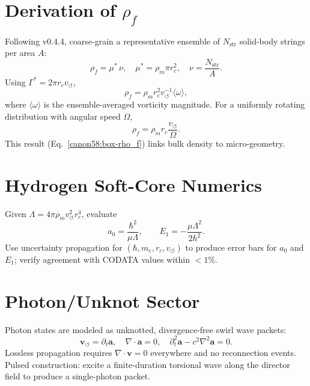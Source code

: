 \documentclass[10pt,reprint,aps,onecolumn,nofootinbib]{revtex4-2}
\begin{document}
    \section{Derivation of $\rho_{\!f}$}
    \label{canon58:appC}
    Following v0.4.4, coarse-grain a representative ensemble of $N_{\mathrm{str}}$
    solid-body strings per area $A$:
    \[
        \rho_{\!f} = \mu^{*}\,\nu, \quad
        \mu^{*} = \rho_{\!m} \pi r_c^{2}, \quad
        \nu = \frac{N_{\mathrm{str}}}{A}.
    \]
    Using $\Gamma^{*} = 2\pi r_c v_{\!\boldsymbol{\circlearrowleft}}$,
    \[
        \rho_{\!f} = \rho_{\!m} r_c^{2} v_{\!\boldsymbol{\circlearrowleft}}^{-1} \langle \omega \rangle,
    \]
    where $\langle \omega \rangle$ is the ensemble-averaged vorticity magnitude.
    For a uniformly rotating distribution with angular speed $\Omega$,
    \[
        \rho_{\!f} = \rho_{\!m} r_c \frac{v_{\!\boldsymbol{\circlearrowleft}}}{\Omega}.
    \]
    This result (Eq.~\eqref{canon58:box-rho_f}) links bulk density to micro-geometry.

    \section{Hydrogen Soft-Core Numerics}
    \label{canon58:appD}
    Given $\Lambda = 4\pi \rho_{\!m} v_{\!\boldsymbol{\circlearrowleft}}^{2} r_c^{4}$,
    evaluate
    \[
        a_0 = \frac{\hbar^{2}}{\mu \Lambda}, \qquad
        E_1 = - \frac{\mu \Lambda^{2}}{2\hbar^{2}}.
    \]
    Use uncertainty propagation for $(\hbar, m_e, r_c, v_{\!\boldsymbol{\circlearrowleft}})$ to
    produce error bars for $a_0$ and $E_1$; verify agreement with CODATA values
    within $<1\%$.

    \section{Photon/Unknot Sector}
    \label{canon58:appE}
    Photon states are modeled as unknotted, divergence-free swirl wave packets:
    \[
        \mathbf{v}_{\!\boldsymbol{\circlearrowleft}} = \partial_t \mathbf{a}, \quad
        \nabla \cdot \mathbf{a} = 0, \quad
        \partial_t^{2}\mathbf{a} - c^{2}\nabla^{2}\mathbf{a} = 0.
    \]
    Lossless propagation requires $\nabla\cdot\mathbf{v}=0$ everywhere and
    no reconnection events. Pulsed construction: excite a finite-duration
    torsional wave along the director field to produce a single-photon packet.
\end{document}
